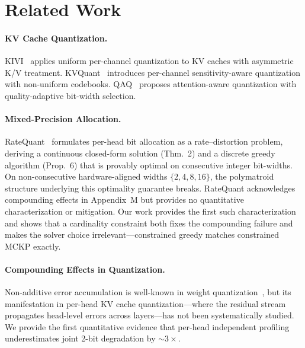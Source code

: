 \documentclass[11pt,a4paper]{article}
\begin{document}
\section{Related Work}
\label{sec:related}

\paragraph{KV Cache Quantization.}
KIVI~\cite{liu2024kivi} applies uniform per-channel quantization to KV caches with asymmetric K/V treatment.
KVQuant~\cite{hooper2024kvquant} introduces per-channel sensitivity-aware quantization with non-uniform codebooks.
QAQ~\cite{dong2024qaq} proposes attention-aware quantization with quality-adaptive bit-width selection.

\paragraph{Mixed-Precision Allocation.}
RateQuant~\cite{ratequant2024} formulates per-head bit allocation as a rate--distortion problem, deriving a continuous closed-form solution (Thm.~2) and a discrete greedy algorithm (Prop.~6) that is provably optimal on consecutive integer bit-widths.
On non-consecutive hardware-aligned widths $\{2,4,8,16\}$, the polymatroid structure underlying this optimality guarantee breaks.
RateQuant acknowledges compounding effects in Appendix~M but provides no quantitative characterization or mitigation.
Our work provides the first such characterization and shows that a cardinality constraint both fixes the compounding failure and makes the solver choice irrelevant---constrained greedy matches constrained MCKP exactly.

\paragraph{Compounding Effects in Quantization.}
Non-additive error accumulation is well-known in weight quantization~\cite{nagel2020up}, but its manifestation in per-head KV cache quantization---where the residual stream propagates head-level errors across layers---has not been systematically studied.
We provide the first quantitative evidence that per-head independent profiling underestimates joint 2-bit degradation by ${\sim}3\times$.


\end{document}
